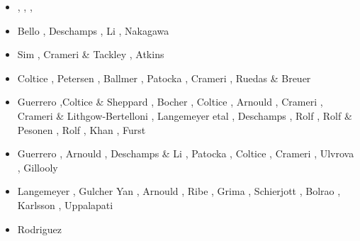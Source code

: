 \begin{itemize}
\begin{scriptsize}
\begin{itemize}
                            \cite{nata13}\cite{mowe13},
\item[\twothousandfourteen] \cite{yadl14}\cite{crta14},
                            \cite{roct14}\cite{cort14},
                            \cite{becr14}\cite{lidt14},
                            \cite{robg14}\cite{nata14}
\item[\twothousandfifteen] Bello \etal \cite{bect15}, Deschamps \etal \cite{delt15},
                           Li \etal \cite{lidt15}, Nakagawa \etal \cite{nani15}
\item[\twothousandsixteen] Sim \etal \cite{sisc16}, Crameri \& Tackley \cite{crta16}, 
                           Atkins \etal \cite{atvt16}
\item[\twothousandseventeen] Coltice \etal \cite{cogu17}, Petersen \etal \cite{pest17}, 
                             Ballmer \etal \cite{bahh17}, Patocka \etal \cite{pact17}, 
                             Crameri \etal \cite{crlt17}, Ruedas \& Breuer \cite{rubr17} 
\item[\twothousandeighteen] Guerrero \etal \cite{guld18},Coltice \& Sheppard \cite{cosh18}, 
                            Bocher \etal \cite{bofc18}, Coltice \etal \cite{cold18}, 
                            Arnould \etal \cite{arcf18}, Crameri \cite{cram18}, 
                            Crameri \& Lithgow-Bertelloni \cite{crli18}, Langemeyer etal \cite{lalt18}, 
                            Deschamps \etal \cite{dert18}, Rolf \etal \cite{ross18},
                            Rolf \& Pesonen \cite{rope18}, Rolf \etal \cite{roct18},
                            Khan \etal \cite{khlr18}, Furst \etal \cite{fupc18}
\item[\twothousandnineteen] Guerrero \etal \cite{gult19}, Arnould \etal \cite{argc19},
                            Deschamps \& Li \cite{deli19}, Patocka \etal \cite{pact19},
                            Coltice \etal \cite{cohf19}, Crameri \etal \cite{crcm19},
                            Ulvrova \etal \cite{ulcw19}, Gillooly \etal \cite{gicw19}
\item[\twothousandtwenty] Langemeyer \etal \cite{lalt20}, Gulcher \etal \cite{gugb20}
                          Yan \etal \cite{yabt20}, Arnould \etal \cite{arcf20}, 
                          Ribe \etal \cite{rits20}, Grima \etal \cite{grlc20}, 
                          Schierjott \etal \cite{scrt20}, 
                          Bolrao \etal \cite{bobm20}, Karlsson \etal \cite{kacc20},
                          Uppalapati \etal \cite{uprc20}
\item[\twothousandtwentyone] Rodriguez \etal \cite{roac21}
\end{itemize}
\end{scriptsize}


\end{itemize}

